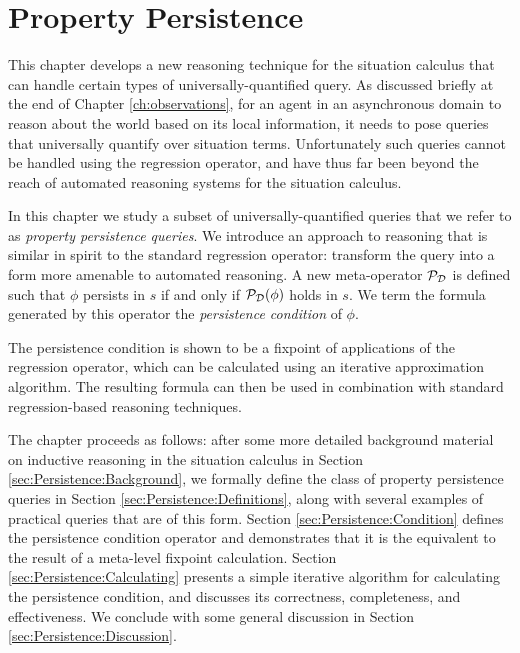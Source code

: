 

\chapter{Property Persistence}

\label{ch:persistence}

This chapter develops a new reasoning technique for the situation
calculus that can handle certain types of universally-quantified query.
As discussed briefly at the end of Chapter \ref{ch:observations},
for an agent in an asynchronous domain to reason about the world based
on its local information, it needs to pose queries that universally
quantify over situation terms. Unfortunately such queries cannot be
handled using the regression operator, and have thus far been beyond
the reach of automated reasoning systems for the situation calculus.

In this chapter we study a subset of universally-quantified queries
that we refer to as \emph{property persistence queries}. We introduce
an approach to reasoning that is similar in spirit to the standard
regression operator: transform the query into a form more amenable
to automated reasoning. A new meta-operator $\mathcal{P}_{\mathcal{D}}$ is defined
such that $\phi$ persists in $s$ if and only if $\mathcal{P}_{\mathcal{D}}(\phi)$
holds in $s$. We term the formula generated by this operator the
\emph{persistence condition} of $\phi$.

The persistence condition is shown to be a fixpoint of applications
of the regression operator, which can be calculated using an iterative
approximation algorithm. The resulting formula can then be used in
combination with standard regression-based reasoning techniques.

The chapter proceeds as follows: after some more detailed background
material on inductive reasoning in the situation calculus in Section
\ref{sec:Persistence:Background}, we formally define the class of
property persistence queries in Section \ref{sec:Persistence:Definitions},
along with several examples of practical queries that are of this
form. Section \ref{sec:Persistence:Condition} defines the persistence
condition operator and demonstrates that it is the equivalent to the
result of a meta-level fixpoint calculation. Section \ref{sec:Persistence:Calculating}
presents a simple iterative algorithm for calculating the persistence
condition, and discusses its correctness, completeness, and effectiveness.
We conclude with some general discussion in Section \ref{sec:Persistence:Discussion}.


